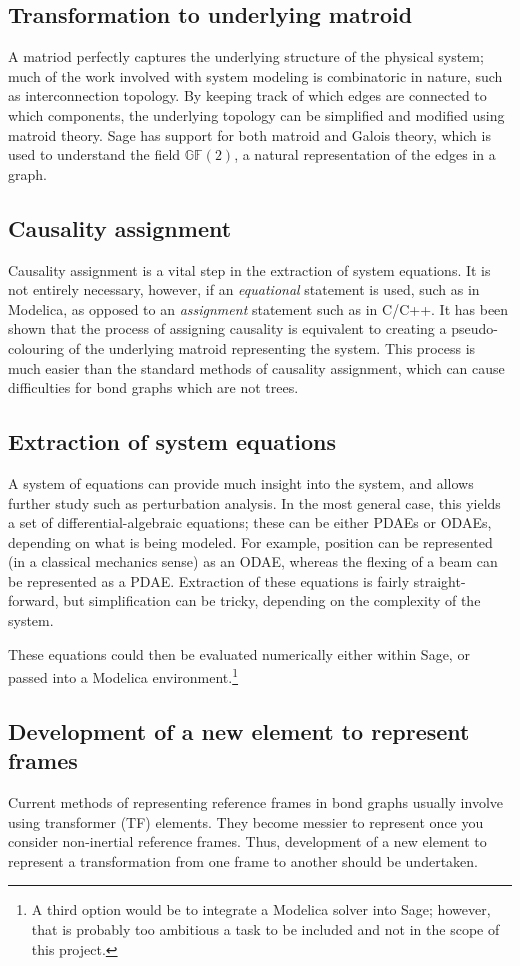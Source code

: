 \documentclass[utf8,a4paper,12pt]{report}
\begin{document}
\subsection{Transformation to underlying matroid}
A matriod perfectly captures the underlying structure of the physical system; much of the work involved with system modeling is combinatoric in nature, such as interconnection topology. By keeping track of which edges are connected to which components, the underlying topology can be simplified and modified using matroid theory. Sage has support for both matroid and Galois theory, which is used to understand the field $\mathbb{GF}(2)$, a natural representation of the edges in a graph.
\subsection{Causality assignment}
Causality assignment is a vital step in the extraction of system equations.  It is not entirely necessary, however, if an \emph{equational} statement is used, such as in Modelica, as opposed to an \emph{assignment} statement such as in C/C++. It has been shown that the process of assigning causality is equivalent to creating a pseudo-colouring of the underlying matroid representing the system. This process is much easier than the standard methods of causality assignment, which can cause difficulties for bond graphs which are not trees.
\subsection{Extraction of system equations}
A system of equations can provide much insight into the system, and allows further study such as perturbation analysis. In the most general case, this yields a set of differential-algebraic equations; these can be either PDAEs or ODAEs, depending on what is being modeled. For example, position can be represented (in a classical mechanics sense) as an ODAE, whereas the flexing of a beam can be represented as a PDAE. Extraction of these equations is fairly straight-forward, but simplification can be tricky, depending on the complexity of the system.

These equations could then be evaluated numerically either within Sage, or passed into a Modelica environment.\footnote{A third option would be to integrate a Modelica solver into Sage; however, that is probably too ambitious a task to be included and not in the scope of this project.}
\subsection{Development of a new element to represent frames}
Current methods of representing reference frames in bond graphs usually involve using transformer (TF) elements. They become messier to represent once you consider non-inertial reference frames. Thus, development of a new element to represent a transformation from one frame to another should be undertaken.
\end{document}
